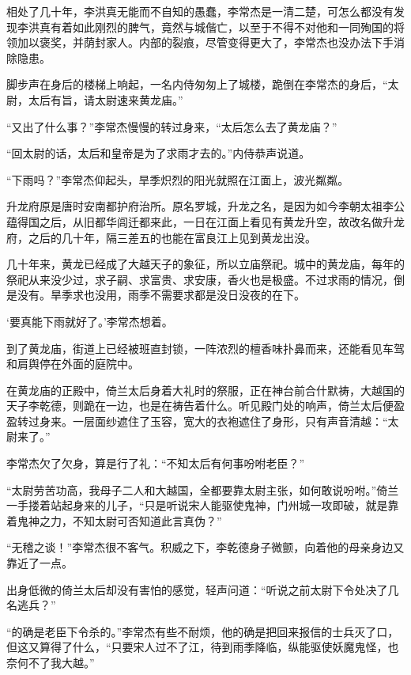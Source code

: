 相处了几十年，李洪真无能而不自知的愚蠢，李常杰是一清二楚，可怎么都没有发现李洪真有着如此刚烈的脾气，竟然与城偕亡，以至于不得不对他和一同殉国的将领加以褒奖，并荫封家人。内部的裂痕，尽管变得更大了，李常杰也没办法下手消除隐患。

脚步声在身后的楼梯上响起，一名内侍匆匆上了城楼，跪倒在李常杰的身后，“太尉，太后有旨，请太尉速来黄龙庙。”

“又出了什么事？”李常杰慢慢的转过身来，“太后怎么去了黄龙庙？”

“回太尉的话，太后和皇帝是为了求雨才去的。”内侍恭声说道。

“下雨吗？”李常杰仰起头，旱季炽烈的阳光就照在江面上，波光粼粼。

升龙府原是唐时安南都护府治所。原名罗城，升龙之名，是因为如今李朝太祖李公蕴得国之后，从旧都华闾迁都来此，一日在江面上看见有黄龙升空，故改名做升龙府，之后的几十年，隔三差五的也能在富良江上见到黄龙出没。

几十年来，黄龙已经成了大越天子的象征，所以立庙祭祀。城中的黄龙庙，每年的祭祀从来没少过，求子嗣、求富贵、求安康，香火也是极盛。不过求雨的情况，倒是没有。旱季求也没用，雨季不需要求都是没日没夜的在下。

‘要真能下雨就好了。’李常杰想着。

到了黄龙庙，街道上已经被班直封锁，一阵浓烈的檀香味扑鼻而来，还能看见车驾和肩舆停在外面的庭院中。

在黄龙庙的正殿中，倚兰太后身着大礼时的祭服，正在神台前合什默祷，大越国的天子李乾德，则跪在一边，也是在祷告着什么。听见殿门处的响声，倚兰太后便盈盈转过身来。一层面纱遮住了玉容，宽大的衣袍遮住了身形，只有声音清越：“太尉来了。”

李常杰欠了欠身，算是行了礼：“不知太后有何事吩咐老臣？”

“太尉劳苦功高，我母子二人和大越国，全都要靠太尉主张，如何敢说吩咐。”倚兰一手搂着站起身来的儿子，“只是听说宋人能驱使鬼神，门州城一攻即破，就是靠着鬼神之力，不知太尉可否知道此言真伪？”

“无稽之谈！”李常杰很不客气。积威之下，李乾德身子微颤，向着他的母亲身边又靠近了一点。

出身低微的倚兰太后却没有害怕的感觉，轻声问道：“听说之前太尉下令处决了几名逃兵？”

“的确是老臣下令杀的。”李常杰有些不耐烦，他的确是把回来报信的士兵灭了口，但这又算得了什么，“只要宋人过不了江，待到雨季降临，纵能驱使妖魔鬼怪，也奈何不了我大越。”


